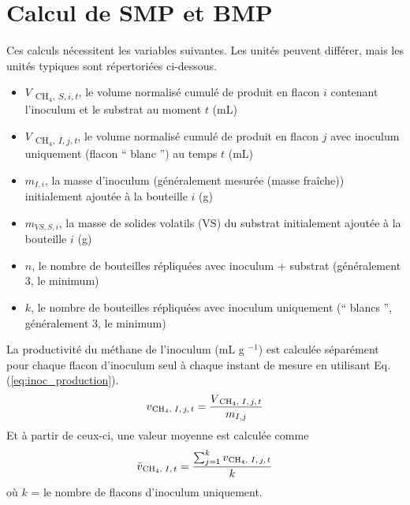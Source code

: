 \documentclass[]{article}
\begin{document}
\section{Calcul de SMP et BMP}
Ces calculs nécessitent les variables suivantes.
Les unités peuvent différer, mais les unités typiques sont répertoriées ci-dessous.
\begin{itemize}
  \item $V$ \textsubscript{{CH$_4$, $S, i, t$}}, le volume normalisé cumulé de  produit en flacon $i$ contenant l'inoculum et le substrat au moment $t$ (mL)
  \item $V$ \textsubscript{{CH$_4$, $I, j, t$}}, le volume normalisé cumulé de  produit en flacon $j$ avec inoculum uniquement (flacon `` blanc '') au temps $t$ (mL)
  \item $m_{I, i}$, la masse d'inoculum (généralement mesurée (masse fraîche)) initialement ajoutée à la bouteille $i$ (g)
  \item $m_{VS, S, i}$, la masse de solides volatils (VS) du substrat initialement ajoutée à la bouteille $i$ (g)
  \item $n$, le nombre de bouteilles répliquées avec inoculum + substrat (généralement 3, le minimum)
  \item $k$, le nombre de bouteilles répliquées avec inoculum uniquement (`` blancs '', généralement 3, le minimum)
\end{itemize}

La productivité du méthane de l'inoculum (mL g $^{-1}$) est calculée séparément pour chaque flacon d'inoculum seul à chaque instant de mesure en utilisant Eq. (\ref{eq:inoc_production}).
\begin{equation}
  \label{eq:inoc_production}
  v\textsubscript{{CH$_4$, $I, j, t$}} = \frac {V\textsubscript{{CH$_4$, $I, j, t$}} } { m_{I, j} }
\end{equation}
Et à partir de ceux-ci, une valeur moyenne est calculée comme
\begin{equation}
  \label{eq:inoc_productivity}
  \bar{v}\textsubscript{{CH$_4$, $I, t$}} = \frac{\sum_{j = 1} ^k v\textsubscript{{CH$_4$, $I, j, t$}}} {k}
\end{equation}
où $k$ = le nombre de flacons d'inoculum uniquement.
\end{document}
